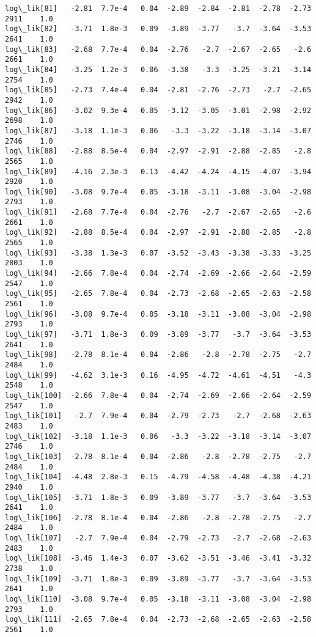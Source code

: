 \documentclass[11pt]{article}
\begin{document}
\begin{Verbatim}[commandchars=\\\{\}]
log\_lik[81]   -2.81  7.7e-4   0.04  -2.89  -2.84  -2.81  -2.78  -2.73   2911    1.0
log\_lik[82]   -3.71  1.8e-3   0.09  -3.89  -3.77   -3.7  -3.64  -3.53   2641    1.0
log\_lik[83]   -2.68  7.7e-4   0.04  -2.76   -2.7  -2.67  -2.65   -2.6   2661    1.0
log\_lik[84]   -3.25  1.2e-3   0.06  -3.38   -3.3  -3.25  -3.21  -3.14   2754    1.0
log\_lik[85]   -2.73  7.4e-4   0.04  -2.81  -2.76  -2.73   -2.7  -2.65   2942    1.0
log\_lik[86]   -3.02  9.3e-4   0.05  -3.12  -3.05  -3.01  -2.98  -2.92   2698    1.0
log\_lik[87]   -3.18  1.1e-3   0.06   -3.3  -3.22  -3.18  -3.14  -3.07   2746    1.0
log\_lik[88]   -2.88  8.5e-4   0.04  -2.97  -2.91  -2.88  -2.85   -2.8   2565    1.0
log\_lik[89]   -4.16  2.3e-3   0.13  -4.42  -4.24  -4.15  -4.07  -3.94   2920    1.0
log\_lik[90]   -3.08  9.7e-4   0.05  -3.18  -3.11  -3.08  -3.04  -2.98   2793    1.0
log\_lik[91]   -2.68  7.7e-4   0.04  -2.76   -2.7  -2.67  -2.65   -2.6   2661    1.0
log\_lik[92]   -2.88  8.5e-4   0.04  -2.97  -2.91  -2.88  -2.85   -2.8   2565    1.0
log\_lik[93]   -3.38  1.3e-3   0.07  -3.52  -3.43  -3.38  -3.33  -3.25   2803    1.0
log\_lik[94]   -2.66  7.8e-4   0.04  -2.74  -2.69  -2.66  -2.64  -2.59   2547    1.0
log\_lik[95]   -2.65  7.8e-4   0.04  -2.73  -2.68  -2.65  -2.63  -2.58   2561    1.0
log\_lik[96]   -3.08  9.7e-4   0.05  -3.18  -3.11  -3.08  -3.04  -2.98   2793    1.0
log\_lik[97]   -3.71  1.8e-3   0.09  -3.89  -3.77   -3.7  -3.64  -3.53   2641    1.0
log\_lik[98]   -2.78  8.1e-4   0.04  -2.86   -2.8  -2.78  -2.75   -2.7   2484    1.0
log\_lik[99]   -4.62  3.1e-3   0.16  -4.95  -4.72  -4.61  -4.51   -4.3   2548    1.0
log\_lik[100]  -2.66  7.8e-4   0.04  -2.74  -2.69  -2.66  -2.64  -2.59   2547    1.0
log\_lik[101]   -2.7  7.9e-4   0.04  -2.79  -2.73   -2.7  -2.68  -2.63   2483    1.0
log\_lik[102]  -3.18  1.1e-3   0.06   -3.3  -3.22  -3.18  -3.14  -3.07   2746    1.0
log\_lik[103]  -2.78  8.1e-4   0.04  -2.86   -2.8  -2.78  -2.75   -2.7   2484    1.0
log\_lik[104]  -4.48  2.8e-3   0.15  -4.79  -4.58  -4.48  -4.38  -4.21   2940    1.0
log\_lik[105]  -3.71  1.8e-3   0.09  -3.89  -3.77   -3.7  -3.64  -3.53   2641    1.0
log\_lik[106]  -2.78  8.1e-4   0.04  -2.86   -2.8  -2.78  -2.75   -2.7   2484    1.0
log\_lik[107]   -2.7  7.9e-4   0.04  -2.79  -2.73   -2.7  -2.68  -2.63   2483    1.0
log\_lik[108]  -3.46  1.4e-3   0.07  -3.62  -3.51  -3.46  -3.41  -3.32   2738    1.0
log\_lik[109]  -3.71  1.8e-3   0.09  -3.89  -3.77   -3.7  -3.64  -3.53   2641    1.0
log\_lik[110]  -3.08  9.7e-4   0.05  -3.18  -3.11  -3.08  -3.04  -2.98   2793    1.0
log\_lik[111]  -2.65  7.8e-4   0.04  -2.73  -2.68  -2.65  -2.63  -2.58   2561    1.0

\end{Verbatim}
\end{document}
